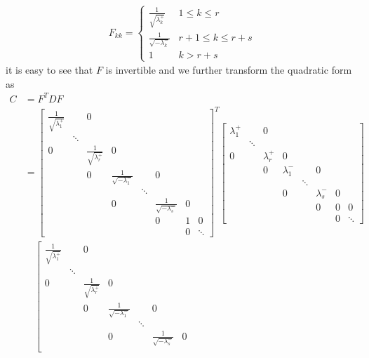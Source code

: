 \begin{align*}
F_{kk} = 
\begin{cases}
\frac{1}{\sqrt{\lambda_{k}^+}} & 1 \leq k \leq r \\
\frac{1}{\sqrt{-\lambda_{k}^-}} & r+1 \leq k \leq r+s \\
1 & k > r+s
\end{cases}
\end{align*}
it is easy to see that $F$ is invertible and we further transform the quadratic form as
\begin{align*}
C &= F^TDF \\
&= \left[\begin{smallmatrix}
\frac{1}{\sqrt{\lambda_{1}^+}} & & 0 & & & & &\\
 & \ddots & & & & & & \\
0 & & \frac{1}{\sqrt{\lambda_{r}^+}} & 0 & & & &\\
 & & 0 & \frac{1}{\sqrt{-\lambda_{1}^-}} & & 0 & & \\
 & & & & \ddots & & & \\
 & & & 0 & & \frac{1}{\sqrt{-\lambda_{s}^-}} & 0 &  \\
 & & & & & 0 & 1 & 0\\
 & & & & & & 0 & \ddots
\end{smallmatrix}\right]^T
\left[\begin{smallmatrix}
\lambda_1^+ & & 0 & & & & &\\
 & \ddots & & & & & & \\
0 & & \lambda_{r}^+ & 0 & & & &\\
 & & 0 & \lambda_{1}^- & & 0 & & \\
 & & & & \ddots & & & \\
 & & & 0 & & \lambda_{s}^- & 0 &  \\
 & & & & & 0 & 0 & 0\\
 & & & & & & 0 & \ddots
\end{smallmatrix}\right] \\
& \quad \left[\begin{smallmatrix}
\frac{1}{\sqrt{\lambda_{1}^+}} & & 0 & & & & &\\
 & \ddots & & & & & & \\
0 & & \frac{1}{\sqrt{\lambda_{r}^+}} & 0 & & & &\\
 & & 0 & \frac{1}{\sqrt{-\lambda_{1}^-}} & & 0 & & \\
 & & & & \ddots & & & \\
 & & & 0 & & \frac{1}{\sqrt{-\lambda_{s}^-}} & 0 &  \\

\end{smallmatrix}
\end{align*}
